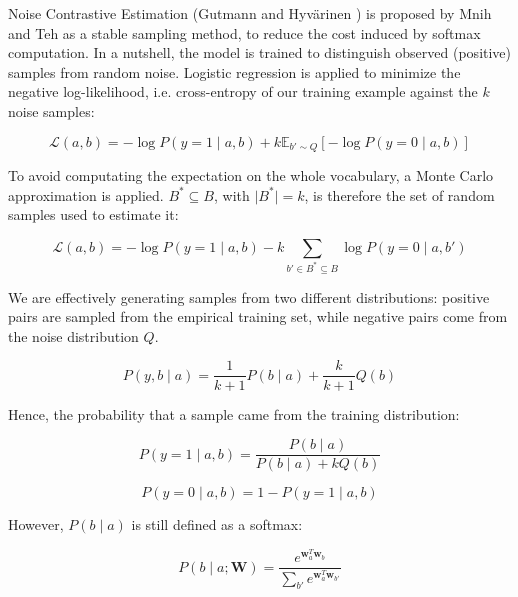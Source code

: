 \documentclass[a4paper,oneside,12pt]{article}
\begin{document}
Noise Contrastive Estimation (Gutmann and Hyvärinen \cite{pmlr-v9-gutmann10a}) is proposed by Mnih and Teh \cite{mnih2012fast} as a stable sampling method, to reduce the cost induced by softmax computation.
In a nutshell, the model is trained to distinguish observed (positive) samples from random noise.
Logistic regression is applied to minimize the negative log-likelihood, i.e. cross-entropy of our training example against the $k$ noise samples:


\begin{equation}
\mathcal{L} (a, b) = - \log P(y = 1 \mid a, b) + k \mathbb{E}_{b' \sim Q}\left[ - \log P(y = 0 \mid a, b) \right]
\end{equation}

To avoid computating the expectation on the whole vocabulary, a Monte Carlo approximation is applied.
$B^* \subseteq B$, with $\vert B^* \vert = k$, is therefore the set of random samples used to estimate it:

\begin{equation}
\mathcal{L} (a, b) = - \log P(y = 1 \mid a, b) - k \sum_{b' \in B^* \subseteq B} \log P(y = 0 \mid a, b')
\end{equation}

We are effectively generating samples from two different distributions: positive pairs are sampled from the empirical training set, while negative pairs come from the noise distribution $Q$.

\begin{equation}
P(y, b \mid a) = \frac{1}{k + 1} P(b \mid a) + \frac{k}{k + 1} Q(b)
\end{equation}

Hence, the probability that a sample came from the training distribution:

\begin{equation}
P(y = 1 \mid a, b) = \frac{P(b \mid a)}{P(b \mid a) + k Q(b)}
\end{equation}

\begin{equation}
P(y = 0 \mid a, b) = 1 - P(y = 1 \mid a, b)
\end{equation}

However, $P(b \mid a)$ is still defined as a softmax:

\begin{equation}
P(b \mid a ; \mathbf{W}) = \frac{e^{\mathbf{w}_a^T \mathbf{w}_b}}{\sum_{b'} e^{\mathbf{w}_a^T \mathbf{w}_{b'}}}
\end{equation}
\end{document}
